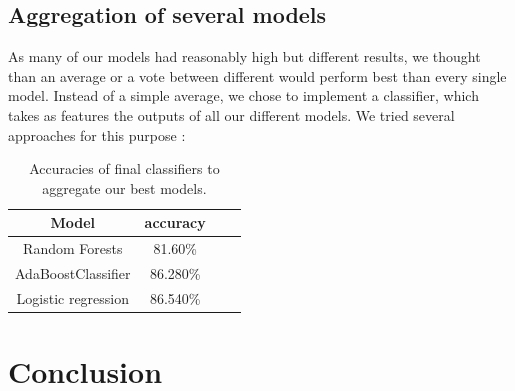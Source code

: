 \documentclass[10pt,conference,compsocconf]{IEEEtran}
\begin{document}
\subsection{Aggregation of several models}

As many of our models had reasonably high but different results, we thought than an average or a vote between different would perform best than every single model. Instead of a simple average, we chose to implement a classifier, which takes as features the outputs of all our different models. We tried several approaches for this purpose : 
\begin{table}[h]
\begin{center}
\begin{tabular}{|c|c|c|c|}
\hline
Model & accuracy \\
\hline
Random Forests & 81.60\% \\
\hline
AdaBoostClassifier & 86.280\% \\
\hline
Logistic regression & 86.540\% \\
\hline

\end{tabular}
\label{classifier}
\caption{Accuracies of final classifiers to aggregate our best models.}
\end{center}
\end{table}


\section{Conclusion}
\end{document}
